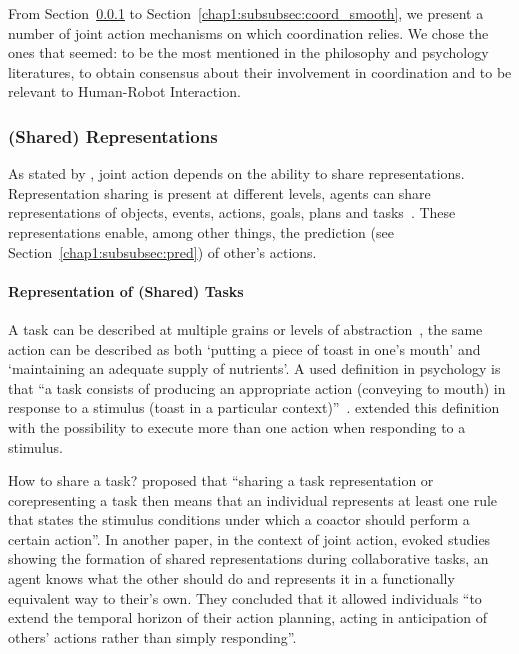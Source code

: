 \documentclass[a4paper,11pt,twoside]{StyleThese}
\begin{document}
From Section~\ref{chap1:subsubsec:shared_rep} to Section~\ref{chap1:subsubsec:coord_smooth}, we present a number of joint action mechanisms on which coordination relies. We chose the ones that seemed: to be the most mentioned in the philosophy and psychology literatures, to obtain consensus about their involvement in coordination and to be relevant to Human-Robot Interaction. 

\subsubsection{(Shared) Representations}\label{chap1:subsubsec:shared_rep}
As stated by \cite{sebanz_2006_joint}, joint action depends on the ability to share representations. Representation sharing is present at different levels, \ie agents can share representations of objects, events, actions, goals, plans and tasks~\citep{pacherie_2012_agency,vesper_2017_joint}. These representations enable, among other things, the prediction (see Section~\ref{chap1:subsubsec:pred}) of other's actions. 

\paragraph{Representation of (Shared) Tasks}
A task can be described at multiple grains or levels of abstraction~\citep{cooper_2000_contention},  the same action can be described as both ‘putting a piece of toast in one’s mouth’ and ‘maintaining an adequate supply of nutrients’. A used definition in psychology is that ``a task consists of producing an appropriate action (\eg conveying to mouth) in response to a stimulus (\eg toast in a particular context)''~\citep[p.~1]{monsell_2003_task}. \cite{sebanz_2005_two} extended this definition with the possibility to execute more than one action when responding to a stimulus. 

How to share a task? \citet[p.~1235]{sebanz_2005_two} proposed that ``sharing a task representation or corepresenting a task then means that an individual represents at least one rule that states the stimulus conditions under which a coactor should perform a certain action''.
In another paper, in the context of joint action, \citet[p.~73]{sebanz_2006_joint} evoked studies showing the formation of shared representations during collaborative tasks, \ie an agent knows what the other should do and represents it in a functionally equivalent way to their's own. They concluded that it allowed individuals ``to extend the temporal horizon of their action planning,
acting in anticipation of others’ actions rather than simply responding''.
\end{document}
